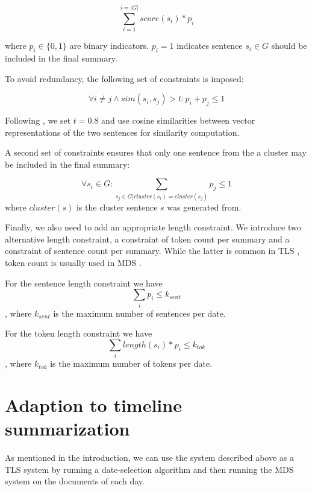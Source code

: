 \documentclass[a4paper,BCOR=10mm]{report}
\numberwithin{lemma}{chapter}
\numberwithin{definition}{chapter}
\begin{document}
\begin{equation}
\sum_{i = 1}^{i = |G|} \mathit{score}(s_i) * p_i
\end{equation}

where $p_i \in \{0, 1\}$ are binary indicators. $p_i = 1$ indicates sentence $s_i \in G$ should be included in the final summary.

To avoid redundancy, the following set of constraints is imposed:

\begin{equation}
\forall i \neq j \land \mathit{sim}(s_i, s_j) > t : p_i + p_{j} \leq 1
\end{equation}

Following \citet{banerjee}, we set $t = 0.8$ and use cosine similarities between vector representations of the two sentences for similarity computation.

A second set of constraints ensures that only one sentence from the a cluster may be included in the final summary:

\begin{equation}
\forall s_i \in G: \sum_{s_j \in G | \mathit{cluster}(s_i) = \mathit{cluster}(s_j)} p_j \leq 1
\end{equation}
where $\mathit{cluster}(s)$ is the cluster sentence $s$ was generated from.

Finally, we also need to add an appropriate length constraint.
We introduce two alternative length constraint, a constraint of token count per summary and a constraint of sentence count per summary.
While the latter is common in TLS \citep{markert, yan-trans}, token count is usually used in MDS \citet{duc2005}.

For the sentence length constraint we have
\begin{equation}
\sum_{i} p_i \leq k_{sent}
\end{equation}, where $k_{sent}$ is the maximum number of sentences per date.

For the token length constraint we have
\begin{equation}
\sum_{i} \mathit{length}(s_i) * p_i \leq k_{tok}
\end{equation}, where $k_{tok}$ is the maximum number of tokens per date.


\section{Adaption to timeline summarization}

As mentioned in the introduction, we can use the system described above as a TLS system by running a date-selection algorithm and then running the MDS system on the documents of each day.
\end{document}
